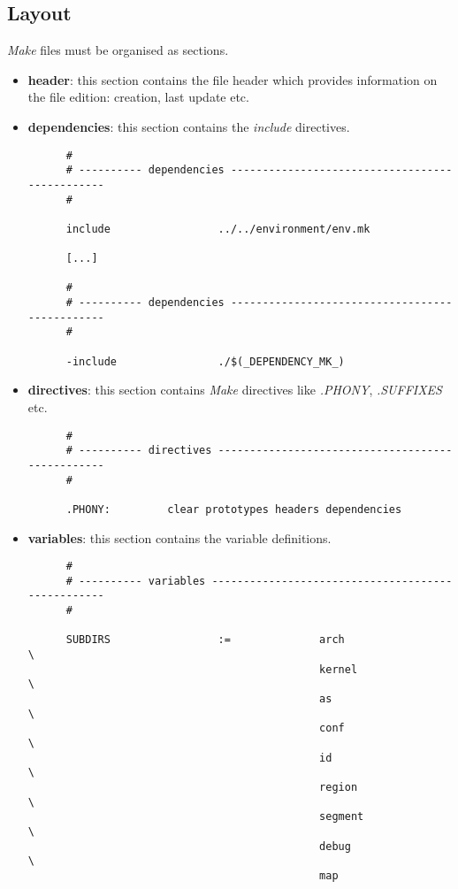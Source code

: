 
\subsection{Layout}

\textit{Make} files must be organised as sections.

\begin{itemize}
  \item
    \textbf{header}: this section contains the file header which provides
    information on the file edition: creation, last update etc.
  \item
    \textbf{dependencies}: this section contains the \textit{include}
    directives.

    \begin{verbatim}
      #
      # ---------- dependencies -----------------------------------------------
      #

      include                 ../../environment/env.mk

      [...]

      #
      # ---------- dependencies -----------------------------------------------
      #

      -include                ./$(_DEPENDENCY_MK_)
    \end{verbatim}
  \item
    \textbf{directives}: this section contains \textit{Make} directives
    like \textit{.PHONY}, \textit{.SUFFIXES} etc.

    \begin{verbatim}
      #
      # ---------- directives -------------------------------------------------
      #

      .PHONY:         clear prototypes headers dependencies
    \end{verbatim}
  \item
    \textbf{variables}: this section contains the variable definitions.

    \begin{verbatim}
      #
      # ---------- variables --------------------------------------------------
      #

      SUBDIRS                 :=              arch                      \
                                              kernel                    \
                                              as                        \
                                              conf                      \
                                              id                        \
                                              region                    \
                                              segment                   \
                                              debug                     \
                                              map                       


\end{verbatim}
\end{itemize}
